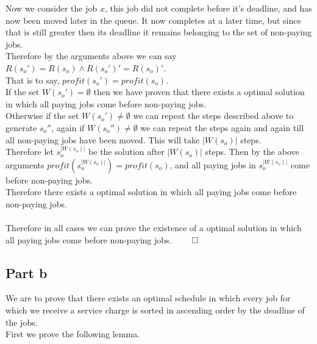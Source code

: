 \documentclass{article}
\begin{document}
          Now we consider the job $x$, this job did not complete before it's deadline, and has now been moved later in the queue. It now completes at a later time, but since that is still greater then its deadline it remains belonging to the set of non-paying jobs. \\
          Therefore by the arguments above we can say $R(s_{o}') = R(s_{o}) \land R(s_{o}')' = R(s_{o})'$. \\
          That is to say, $profit(s_{o}') = profit(s_{o})$. \\
          If the set $W(s_{o}') = \emptyset$ then we have proven that there exists a optimal solution in which all paying jobs come before non-paying jobs. \\
          Otherwise if the set $W(s_{o}') \neq \emptyset$ we can repeat the steps described above to generate $s_{o}''$, again if $W(s_{o}'') \neq \emptyset$ we can repeat the steps again and again till all non-paying jobs have been moved. This will take $|W(s_{o})|$ steps. \\
          Therefore let $s_{o}^{|W(s_{o})|}$ be the solution after $|W(s_{o})|$ steps. 
          Then by the above arguments $profit(s_{o}^{|W(s_{o})|}) = profit(s_{o})$, and all paying jobs in $s_{o}^{|W(s_{o})|}$ come before non-paying jobs. \\
          Therefore there exists a optimal solution in which all paying jobs come before non-paying jobs. \\
          \\
          Therefore in all cases we can prove the existence of a optimal solution in which all paying jobs come before non-paying jobs. $\qed$ \\
    \subsection{Part b}
      We are to prove that there exists an optimal schedule in which every job for which we receive a service charge is sorted in ascending order by the deadline of the jobs. \\
      First we prove the following lemma. \\
\end{document}
